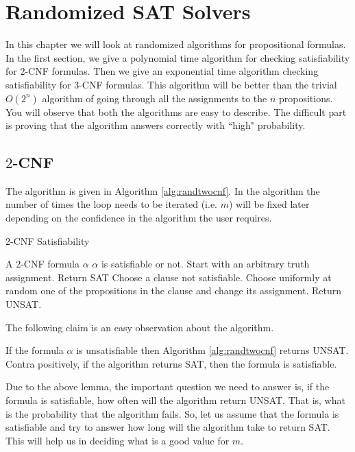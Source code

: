 \newcommand{\expectation}[1]{E[#1]}
\newcommand{\prb}[1]{\mathtt{Prob}~[#1]}

\chapter{Randomized SAT Solvers}
In this chapter we will look at randomized algorithms for propositional formulas. In the first section, we give a polynomial time algorithm for checking satisfiability for 2-CNF formulas. Then we give an exponential time algorithm checking satisfiability for 3-CNF formulas. This algorithm will be better than the trivial $O(2^n)$ algorithm of going through all the assignments to the $n$ propositions. You will observe that both the algorithms are easy to describe. The difficult part is proving that the algorithm answers correctly with ``high" probability. 

\section{$2$-CNF}
The algorithm is given in Algorithm \ref{alg:randtwocnf}. In the algorithm the number of times the loop needs to be iterated (i.e. $m$) will be fixed later depending on the confidence in the algorithm the user requires.

\begin{algorithm}
 \caption{$2$-CNF Satisfiability}
 \label{alg:randtwocnf}
 \begin{algorithmic}[1]
 \renewcommand{\algorithmicrequire}{\textbf{Input:}}
 \renewcommand{\algorithmicensure}{\textbf{Output:}}
 \REQUIRE A $2$-CNF formula $\alpha$
 \ENSURE  $\alpha$ is satisfiable or not.
 \STATE Start with an arbitrary truth assignment.
 \STATE Return SAT
 \ENDIF
 \STATE Choose a clause not satisfiable.
 \STATE Choose uniformly at random one of the propositions in the clause and change its assignment.
 \ENDFOR
 \STATE Return UNSAT.
 \end{algorithmic} 
 \end{algorithm}
 
The following claim is an easy observation about the algorithm. 
\begin{lemma}
If the formula $\alpha$ is unsatisfiable then Algorithm \ref{alg:randtwocnf} returns UNSAT. Contra positively, if the algorithm returns SAT, then the formula is satisfiable.
\end{lemma}

Due to the above lemma, the important question we need to answer is, if the formula is satisfiable, how often will the algorithm return UNSAT. That is, what is the probability that the algorithm fails. So, let us assume that the formula is satisfiable and try to answer how long will the algorithm take to return SAT. This will help us in deciding what is a good value for $m$.  


